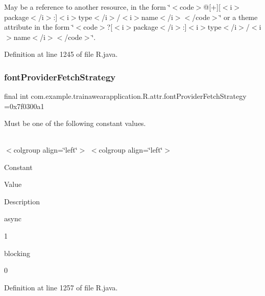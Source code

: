 May be a reference to another resource, in the form \char`\"{}$<$code$>$@\mbox{[}+\mbox{]}\mbox{[}$<$i$>$package$<$/i$>$\+:\mbox{]}$<$i$>$type$<$/i$>$/$<$i$>$name$<$/i$>$$<$/code$>$\char`\"{} or a theme attribute in the form \char`\"{}$<$code$>$?\mbox{[}$<$i$>$package$<$/i$>$\+:\mbox{]}$<$i$>$type$<$/i$>$/$<$i$>$name$<$/i$>$$<$/code$>$\char`\"{}. 

Definition at line 1245 of file R.\+java.

\mbox{\label{classcom_1_1example_1_1trainawearapplication_1_1_r_1_1attr_a39dab2cd54994be8bb3de5f2ed586b69}} 
\subsubsection{\texorpdfstring{fontProviderFetchStrategy}{fontProviderFetchStrategy}}
{\footnotesize\ttfamily final int com.\+example.\+trainawearapplication.\+R.\+attr.\+font\+Provider\+Fetch\+Strategy =0x7f0300a1\hspace{0.3cm}{\ttfamily [static]}}

Must be one of the following constant values.

\tabulinesep=1mm
\begin{longtabu}spread 0pt [c]{*{0}{|X[-1]}|}
\hline
\end{longtabu}
$<$colgroup align=\char`\"{}left\char`\"{}$>$ $<$colgroup align=\char`\"{}left\char`\"{}$>$ 

Constant

Value

Description 

async

1

blocking

0

Definition at line 1257 of file R.\+java.

\mbox{\label{classcom_1_1example_1_1trainawearapplication_1_1_r_1_1attr_ad5459a0cc05630c7eeb3e85c0de11cca}} 
